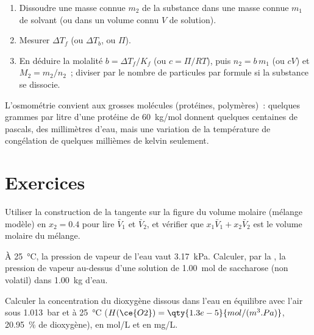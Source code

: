 \begin{method}\label{met:b2:chemical-potential:molar-mass}
\begin{enumerate}
  \item Dissoudre une masse connue $m_2$ de la substance dans une masse connue $m_1$
        de solvant (ou dans un volume connu $V$ de solution).
  \item Mesurer $\Delta T_f$ (ou $\Delta T_b$, ou $\Pi$).
  \item En déduire la molalité $b = \Delta T_f/K_f$ (ou $c = \Pi/RT$), puis $n_2 =
        b\,m_1$ (ou $cV$) et $M_2 = m_2/n_2$~; diviser par le nombre de
        particules par formule si la substance se dissocie.
\end{enumerate}
L'osmométrie convient aux grosses molécules (protéines, polymères)~: quelques grammes par litre
d'une protéine de \qty{60}{kg/mol} donnent quelques centaines de pascals, des millimètres
d'eau, mais une variation de la température de congélation de quelques millièmes de kelvin seulement.
\end{method}

\section{Exercices}

\begin{exercise}[$\star$]\label{exo:b2:chemical-potential:1}
Utiliser la construction de la tangente sur la figure du volume molaire (mélange
modèle) en $x_2 = 0.4$ pour lire $\bar V_1$ et $\bar V_2$, et vérifier que
$x_1\bar V_1 + x_2\bar V_2$ est le volume molaire du mélange.
\end{exercise}

\begin{exercise}[$\star$]\label{exo:b2:chemical-potential:2}
À \qty{25}{\celsius}, la pression de vapeur de l'eau vaut \qty{3.17}{kPa}.
Calculer, par la , la pression de vapeur au-dessus d'une solution de
\qty{1.00}{mol} de saccharose (non volatil) dans \qty{1.00}{kg} d'eau.
\end{exercise}

\begin{exercise}[$\star$]\label{exo:b2:chemical-potential:3}
Calculer la concentration du dioxygène dissous dans l'eau en équilibre avec
l'air sous \qty{1.013}{bar} et à \qty{25}{\celsius} ($H(\ce{O2}) =
\qty{1.3e-5}{mol/(m^3.Pa)}$, \qty{20.95}{\percent} de dioxygène), en
\unit{mol/L} et en \unit{mg/L}.
\end{exercise}

